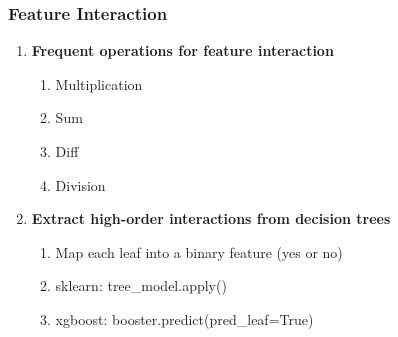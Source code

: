 \documentclass[11pt, twoside]{article}   	%
\begin{document}
\subsubsection{Feature Interaction}
\begin{enumerate}
        \item \textbf{Frequent operations for feature interaction}
    \begin{enumerate}
        \item Multiplication
        \item Sum
        \item Diff
        \item Division
     \end{enumerate}
   \item  \textbf{Extract high-order interactions from decision trees}
    \begin{enumerate}
        \item Map each leaf into a binary feature \big(yes or no\big)
        \item sklearn: tree\_model.apply\big(\big)
        \item xgboost: booster.predict\big(pred\_leaf=True\big)
        
      \end{enumerate}  
 
  \end{enumerate}
\end{document}
